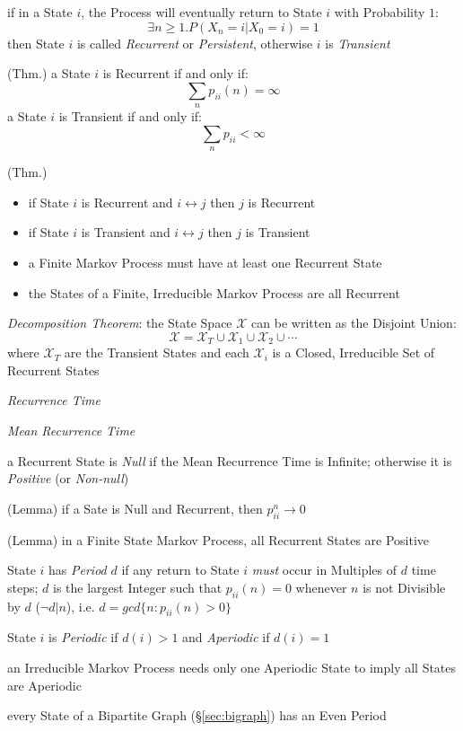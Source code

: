 if in a State $i$, the Process will eventually return to State $i$ with
Probability $1$:
\[
  \exists n \geq 1 . P(X_n = i | X_0 = i) = 1
\]
then State $i$ is called \emph{Recurrent} or \emph{Persistent}, otherwise $i$ is
\emph{Transient}

(Thm.) a State $i$ is Recurrent if and only if:
\[
  \sum_n p_{ii}(n) = \infty
\]
a State $i$ is Transient if and only if:
\[
  \sum_n p_{ii} < \infty
\]

(Thm.)
\begin{itemize}
  \item if State $i$ is Recurrent and $i \leftrightarrow j$ then $j$ is
    Recurrent
  \item if State $i$ is Transient and $i \leftrightarrow j$ then $j$ is
    Transient
  \item a Finite Markov Process must have at least one Recurrent State
  \item the States of a Finite, Irreducible Markov Process are all Recurrent
\end{itemize}

\emph{Decomposition Theorem}:
the State Space $\mathcal{X}$ can be written as the Disjoint Union:
\[
  \mathcal{X} = \mathcal{X}_T \cup \mathcal{X}_1 \cup \mathcal{X}_2 \cup \cdots
\]
where $\mathcal{X}_T$ are the Transient States and each $\mathcal{X}_i$ is a
Closed, Irreducible Set of Recurrent States

\emph{Recurrence Time}

\emph{Mean Recurrence Time}

a Recurrent State is \emph{Null} if the Mean Recurrence Time is Infinite;
otherwise it is \emph{Positive} (or \emph{Non-null})

(Lemma) if a Sate is Null and Recurrent, then $p_{ii}^n \to 0$

(Lemma) in a Finite State Markov Process, all Recurrent States are Positive

State $i$ has \emph{Period} $d$ if any return to State $i$ \emph{must} occur in
Multiples of $d$ time steps; $d$ is the largest Integer such that
$p_{ii}(n) = 0$ whenever $n$ is not Divisible by $d$ ($\neg d | n$), i.e.
$d = gcd\{n : p_{ii}(n) > 0 \}$

State $i$ is \emph{Periodic} if $d(i) > 1$ and \emph{Aperiodic} if $d(i) = 1$

an Irreducible Markov Process needs only one Aperiodic State to imply all States
are Aperiodic

every State of a Bipartite Graph (\S\ref{sec:bigraph}) has an Even Period

